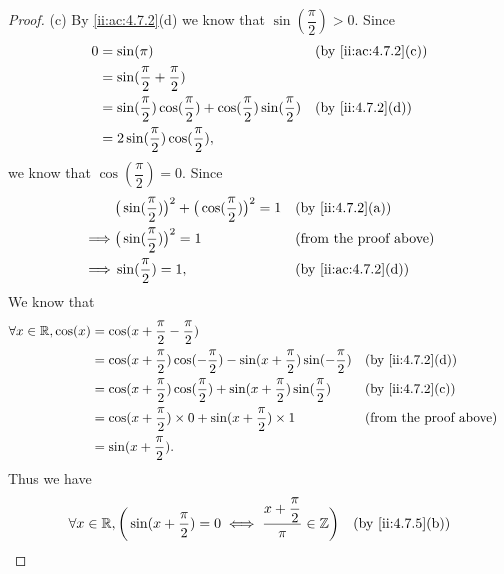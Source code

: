 \begin{proof}{(c)}
  By \cref{ii:ac:4.7.2}(d) we know that \(\sin(\dfrac{\pi}{2}) > 0\).
  Since
  \begin{align*}
    0 & = \sin(\pi)                                                                             &  & \by{ii:ac:4.7.2}[c] \\
      & = \sin(\dfrac{\pi}{2} + \dfrac{\pi}{2})                                                                          \\
      & = \sin(\dfrac{\pi}{2}) \cos(\dfrac{\pi}{2}) + \cos(\dfrac{\pi}{2}) \sin(\dfrac{\pi}{2}) &  & \by{ii:4.7.2}[d]    \\
      & = 2 \sin(\dfrac{\pi}{2}) \cos(\dfrac{\pi}{2}),
  \end{align*}
  we know that \(\cos(\dfrac{\pi}{2}) = 0\).
  Since
  \begin{align*}
             & \big(\sin(\dfrac{\pi}{2})\big)^2 + \big(\cos(\dfrac{\pi}{2})\big)^2 = 1 &  & \by{ii:4.7.2}[a]              \\
    \implies & \big(\sin(\dfrac{\pi}{2})\big)^2 = 1                                    &  & \text{(from the proof above)} \\
    \implies & \sin(\dfrac{\pi}{2}) = 1,                                               &  & \by{ii:ac:4.7.2}[d]
  \end{align*}
  We know that
  \begin{align*}
    \forall x \in \R, \cos(x) & = \cos(x + \dfrac{\pi}{2} - \dfrac{\pi}{2})                                                                                          \\
                              & = \cos(x + \dfrac{\pi}{2}) \cos(-\dfrac{\pi}{2}) - \sin(x + \dfrac{\pi}{2}) \sin(-\dfrac{\pi}{2}) &  & \by{ii:4.7.2}[d]              \\
                              & = \cos(x + \dfrac{\pi}{2}) \cos(\dfrac{\pi}{2}) + \sin(x + \dfrac{\pi}{2}) \sin(\dfrac{\pi}{2})   &  & \by{ii:4.7.2}[c]              \\
                              & = \cos(x + \dfrac{\pi}{2}) \times 0 + \sin(x + \dfrac{\pi}{2}) \times 1                           &  & \text{(from the proof above)} \\
                              & = \sin(x + \dfrac{\pi}{2}).
  \end{align*}
  Thus we have
  \begin{align*}
         & \forall x \in \R, \bigg(\sin(x + \dfrac{\pi}{2}) = 0 \iff \dfrac{x + \dfrac{\pi}{2}}{\pi} \in \Z\bigg)  &  & \by{ii:4.7.5}[b]              \\

\end{align*}
\end{proof}
